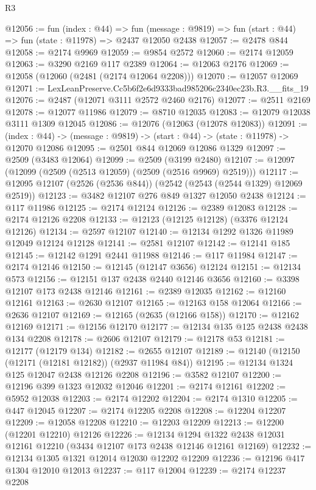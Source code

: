 \begin{lexlean}{R3}
\begin{coremodule}
@12056 := fun (index : @44) =>
  fun (message : @9819) => fun (start : @44) => fun (state : @11978) => @2437 @12050 @2438
@12057 := @2478 @844
@12058 := @2174 @9969
@12059 := @9854 @2572
@12060 := @2174 @12059
@12063 := @3290 @2169 @117 @2389
@12064 := @12063 @2176
@12069 := @12058 (@12060 (@2481 (@2174 @12064 @2208)))
@12070 := @12057 @12069
@12071 := LexLeanPreserve.Cc5b6f2e6d9333bad985206c2340ec23b.R3.__fits_19
@12076 := @2487 (@12071 @3111 @2572 @2460 @2176)
@12077 := @2511 @2169
@12078 := @12077 @11986
@12079 := @8710 @12035
@12083 := @12079 @12038 @3111 @1309 @12045
@12086 := @12076 (@12063 (@12078 @12083))
@12091 := (index : @44) -> (message : @9819) -> (start : @44) -> (state : @11978) -> @12070 @12086
@12095 := @2501 @844 @12069 @12086 @1329
@12097 := @2509 (@3483 @12064)
@12099 := @2509 (@3199 @2480)
@12107 := @12097 (@12099 (@2509 (@2513 @12059) (@2509 (@2516 @9969) @2519)))
@12117 := @12095 @12107 (@2526 (@2536 @844)) (@2542 (@2543 (@2544 @1329) @12069 @2519))
@12123 := @3482 @12107 @276 @849 @1327 @12050 @2438
@12124 := @117 @11986
@12125 := @2174 @12124
@12126 := @2389 @12083
@12128 := @2174 @12126 @2208
@12133 := @12123 (@12125 @12128) (@3376 @12124 @12126)
@12134 := @2597 @12107
@12140 := @12134 @1292 @1326 @11989 @12049 @12124 @12128
@12141 := @2581 @12107
@12142 := @12141 @185
@12145 := @12142 @1291 @2441 @11988
@12146 := @117 @11984
@12147 := @2174 @12146
@12150 := @12145 (@12147 @3656) @12124
@12151 := @12134 @573
@12156 := @12151 @137 @2438 @2440 @12146 @3656
@12160 := @3398 @12107 @173 @2438 @12146
@12161 := @2389 @12035
@12162 := @12160 @12161
@12163 := @2630 @12107
@12165 := @12163 @158 @12064
@12166 := @2636 @12107
@12169 := @12165 (@2635 (@12166 @158))
@12170 := @12162 @12169
@12171 := @12156 @12170
@12177 := @12134 @135 @125 @2438 @2438 @134 @2208
@12178 := @2606 @12107
@12179 := @12178 @53
@12181 := @12177 (@12179 @134)
@12182 := @2655 @12107
@12189 := @12140 (@12150 (@12171 (@12181 @12182)) (@2937 @11984 @84))
@12195 := @12134 @1324 @125 @12047 @2438 @12126 @2208
@12196 := @3582 @12107
@12200 := @12196 @399 @1323 @12032 @12046
@12201 := @2174 @12161
@12202 := @5952 @12038
@12203 := @2174 @12202
@12204 := @2174 @1310
@12205 := @447 @12045
@12207 := @2174 @12205 @2208
@12208 := @12204 @12207
@12209 := @12058 @12208
@12210 := @12203 @12209
@12213 := @12200 (@12201 @12210) @12126
@12226 := @12134
    @1294
    @1322
    @2438
    @12031
    @12161
    @12210
    (@3434 @12107 @173 @2438 @12146 @12161 @12169)
@12232 := @12134 @1305 @1321 @12014 @12030 @12202 @12209
@12236 := @12196 @417 @1304 @12010 @12013
@12237 := @117 @12004
@12239 := @2174 @12237 @2208

\end{coremodule}
\end{lexlean}
